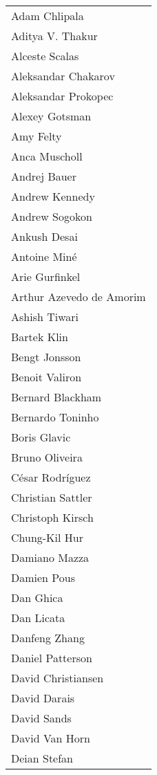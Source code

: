 
\begin{tabular}[t]{@{}p{\namewidth}}
Adam Chlipala \\
Aditya V. Thakur \\
Alceste Scalas \\
Aleksandar Chakarov \\
Aleksandar Prokopec \\
Alexey Gotsman \\
Amy Felty \\
Anca Muscholl \\
Andrej Bauer \\
Andrew Kennedy \\
Andrew Sogokon \\
Ankush Desai \\
Antoine Min\'{e} \\
Arie Gurfinkel \\
Arthur Azevedo de Amorim \\
Ashish Tiwari \\
Bartek Klin \\
Bengt Jonsson \\
Benoit Valiron \\
Bernard Blackham \\
Bernardo Toninho \\
Boris Glavic \\
Bruno Oliveira \\
C\'{e}sar Rodr\'{i}guez \\
Christian Sattler \\
Christoph Kirsch \\
Chung-Kil Hur \\
Damiano Mazza \\
Damien Pous \\
Dan Ghica \\
Dan Licata \\
Danfeng Zhang \\
Daniel Patterson \\
David Christiansen \\
David Darais \\
David Sands \\
David Van Horn \\
Deian Stefan
\end{tabular}
